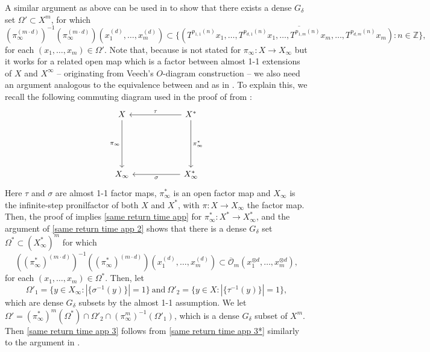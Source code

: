\documentclass[reqno]{amsart}
\def\Z{{\mathbb Z}}
\theoremstyle{definition}
\theoremstyle{remark}
\begin{document}
A similar argument as above can be used in 
\cite[Theorem 3.4]{GKLMRR} to show that there exists a dense $G_{\delta}$ set 
$\Omega'\subset X^m$, for which 
\begin{equation}\label{same return time app 3}
(\pi_{\infty}^{(m\cdot d)})^{-1}(\pi_{\infty}^{(m\cdot d)})(x_1^{(d)},\ldots,x_m^{(d)}) \subset \overline{\{(T^{p_{1,1}(n)}x_1,\ldots,T^{p_{d,1}(n)}x_1,\ldots,T^{p_{1,m}(n)}x_m,\ldots,T^{p_{d,m}(n)}x_m):n\in \Z\}},
\end{equation}
for each $(x_1,\ldots,x_m)\in \Omega'$. Note 
that, because 
\cite[Theorem 3.4]{GKLMRR} is not stated for $\pi_{\infty}:X\to X_{\infty}$ but it works for a related open map which is a factor between almost 1-1 extensions of $X$ and $X^{\infty}$ -- originating from Veech's $O$-diagram construction \cite{veech_o} -- we also need an argument analogous to the equivalence between \cite[Theorem HSY]{Ye_Yu} and \cite[Theorem 3.1]{Ye_Yu} as in \cite[Lemma 3.2]{Ye_Yu}. 
To explain this, we recall the following commuting diagram used in the proof of \cite[Theorem A]{GKLMRR} from \cite[Theorem 3.4]{GKLMRR}: 
\[
\begin{tikzcd}[row sep=2cm, column sep=2cm]
X \arrow[d, "\pi_{\infty}"'] & X^{*} \arrow[l, "\tau"'] \arrow[d, "\pi^{*}_{\infty}"] \\
X_\infty & X_{\infty}^{*} \arrow[l, "\sigma"]
\end{tikzcd}
\]
Here $\tau$ and $\sigma$ are almost 1-1 factor maps, 
$\pi^{*}_{\infty}$ is an open factor map and $X_{\infty}$ is 
the infinite-step pronilfactor of both $X$ and $X^{*}$, with $\pi:X\to X_{\infty}$ the factor map.
Then, the proof of \cite[Theorem 3.4]{GKLMRR} implies \eqref{same return time app} for $\pi^{*}_{\infty}:X^{*}\to X^{*}_{\infty}$, and the argument of \eqref{same return time app 2} shows that there is a dense 
$G_{\delta}$ 
set $\Omega^{*} \subset {(X_{\infty}^{*})}^{m}$ for which 
\begin{equation}\label{same return time app 3*}((\pi^{*}_{\infty})^{(m\cdot d)})^{-1}((\pi^{*}_{\infty})^{(m\cdot d)})(x_1^{(d)},\ldots,x_m^{(d)}) \subset \overline{\mathcal{O}}_{m}(x_1^{\otimes d},\ldots,x_m^{\otimes d}),
\end{equation}
for each $(x_1,\ldots,x_m)\in \Omega^{*}$. Then, let 
$$\Omega'_1=\{y\in X_{\infty}: |\{\sigma^{-1}(y)\}|=1\}\ \text{and}\ \Omega'_2=\{y\in X: |\{\tau^{-1}(y)\}|=1\},$$
which are dense $G_{\delta}$ subsets by the almost 1-1 
assumption. We let $\Omega'=(\pi^{*}_{\infty})^{m}(\Omega^{*}) \cap \Omega'_2 \cap (\pi_{\infty}^m)^{-1}(\Omega'_1)$, which is a dense $G_{\delta}$ subset of $X^m$. Then \eqref{same return time app 3} follows from \eqref{same return time app 3*} similarly to the argument in \cite[Lemma 3.2]{Ye_Yu}.
\end{document}
